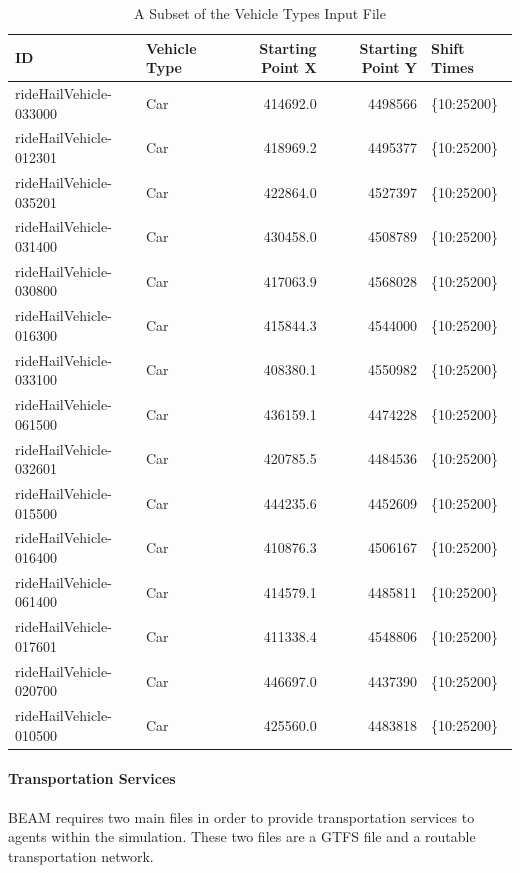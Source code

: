 \documentclass[3p, authoryear, review]{elsarticle} %
\begin{document}
\begin{table}

\caption{\label{tab:rhveh}A Subset of the Vehicle Types Input File}
\centering
\begin{tabular}[t]{llrrl}
\toprule
ID & Vehicle Type & Starting Point X & Starting Point Y & Shift Times\\
\midrule
rideHailVehicle-033000 & Car & 414692.0 & 4498566 & \{10:25200\}\\
rideHailVehicle-012301 & Car & 418969.2 & 4495377 & \{10:25200\}\\
rideHailVehicle-035201 & Car & 422864.0 & 4527397 & \{10:25200\}\\
rideHailVehicle-031400 & Car & 430458.0 & 4508789 & \{10:25200\}\\
rideHailVehicle-030800 & Car & 417063.9 & 4568028 & \{10:25200\}\\
\addlinespace
rideHailVehicle-016300 & Car & 415844.3 & 4544000 & \{10:25200\}\\
rideHailVehicle-033100 & Car & 408380.1 & 4550982 & \{10:25200\}\\
rideHailVehicle-061500 & Car & 436159.1 & 4474228 & \{10:25200\}\\
rideHailVehicle-032601 & Car & 420785.5 & 4484536 & \{10:25200\}\\
rideHailVehicle-015500 & Car & 444235.6 & 4452609 & \{10:25200\}\\
\addlinespace
rideHailVehicle-016400 & Car & 410876.3 & 4506167 & \{10:25200\}\\
rideHailVehicle-061400 & Car & 414579.1 & 4485811 & \{10:25200\}\\
rideHailVehicle-017601 & Car & 411338.4 & 4548806 & \{10:25200\}\\
rideHailVehicle-020700 & Car & 446697.0 & 4437390 & \{10:25200\}\\
rideHailVehicle-010500 & Car & 425560.0 & 4483818 & \{10:25200\}\\
\bottomrule
\end{tabular}
\end{table}

\hypertarget{transportation-services}{%
\paragraph{Transportation Services}\label{transportation-services}}

BEAM requires two main files in order to provide transportation services to agents within the simulation. These two files are a GTFS file and a routable transportation network.
\end{document}
